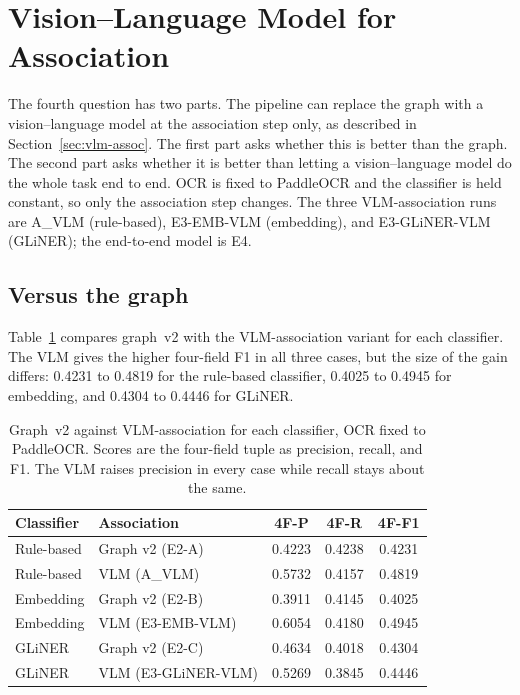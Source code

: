 \section{Vision--Language Model for Association}\label{sec:exp-vlm}

The fourth question has two parts. The pipeline can replace the graph with
a vision--language model at the association step only, as described in
Section~\ref{sec:vlm-assoc}. The first part asks whether this is better
than the graph. The second part asks whether it is better than letting a
vision--language model do the whole task end to end. OCR is fixed to
PaddleOCR and the classifier is held constant, so only the association
step changes. The three VLM-association runs are A\_VLM (rule-based),
E3-EMB-VLM (embedding), and E3-GLiNER-VLM (GLiNER); the end-to-end model
is E4.

\subsection{Versus the graph}\label{sec:exp-vlm-graph}

Table~\ref{tab:vlm-vs-graph} compares graph~v2 with the VLM-association
variant for each classifier. The VLM gives the higher four-field F1 in all
three cases, but the size of the gain differs: 0.4231 to 0.4819 for the
rule-based classifier, 0.4025 to 0.4945 for embedding, and 0.4304 to
0.4446 for GLiNER.

\begin{table}[htbp]
  \centering
  \caption[VLM association versus graph v2]{Graph~v2 against
    VLM-association for each classifier, OCR fixed to PaddleOCR. Scores are
    the four-field tuple as precision, recall, and F1. The VLM raises
    precision in every case while recall stays about the same.}
  \label{tab:vlm-vs-graph}
  \small
  \begin{tabular}{@{}llccc@{}}
    \toprule
    \textbf{Classifier} & \textbf{Association} & \textbf{4F-P} & \textbf{4F-R} & \textbf{4F-F1} \\
    \midrule
    Rule-based & Graph v2 (E2-A)        & 0.4223 & 0.4238 & 0.4231 \\
    Rule-based & VLM (A\_VLM)           & 0.5732 & 0.4157 & 0.4819 \\
    \addlinespace
    Embedding  & Graph v2 (E2-B)        & 0.3911 & 0.4145 & 0.4025 \\
    Embedding  & VLM (E3-EMB-VLM)       & 0.6054 & 0.4180 & 0.4945 \\
    \addlinespace
    GLiNER     & Graph v2 (E2-C)        & 0.4634 & 0.4018 & 0.4304 \\
    GLiNER     & VLM (E3-GLiNER-VLM)    & 0.5269 & 0.3845 & 0.4446 \\
    \bottomrule
  \end{tabular}
\end{table}

